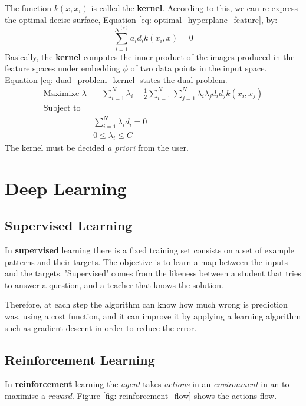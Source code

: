 \documentclass[11pt]{article}
\begin{document}
The function $k(x, x_i)$ is called the \textbf{kernel}. According to this, we can re-express the optimal decise surface, Equation \ref{eq: optimal_hyperplane_feature}, by:
\begin{equation}
\sum^{N^{(s)}}_{i = 1}a_id_ik(x_i,x) = 0
\label{eq: optimal_hyperplane_feature}
\end{equation} 
Basically, the \textbf{kernel} computes the inner product of the images produced in the feature spaces under embedding $\phi$ of two data points in the input space. Equation \ref{eq: dual_problem_kernel} states the dual problem.
\begin{equation}
    \label{eq: dual_problem_kernel}
    \begin{aligned}
    \text{Maximixe } \lambda & \quad \sum^N_{i=1} \lambda_i - \frac{1}{2} \sum_{i=1}^N \sum_{j=1}^N \lambda_i \lambda_j d_i d_j k(x_i,x_j) \\
     \text{Subject to} & \\
           & \sum^N_{i=1} \lambda_i d_i = 0\quad \\
           & 0 \le \lambda_i \le C 
         \end{aligned}
    \end{equation}
The kernel must be decided \emph{a priori} from the user.
\section{Deep Learning}
\subsection{Supervised Learning}
In \textbf{supervised} learning there is a fixed training set consists on a set of example patterns and their targets. The objective is to learn a map between the inputs and the targets. 'Supervised' comes from the likeness between a student that tries to answer a question, and a teacher that knows the solution.

Therefore, at each step the algorithm can know how much wrong is prediction was, using a cost function, and it can improve it by applying a learning algorithm such as gradient descent in order to reduce the error.

\subsection{Reinforcement Learning}
In \textbf{reinforcement} learning the \emph{agent} takes \emph{actions} in an \emph{environment} in an to maximise a \emph{reward}. Figure \ref{fig: reinforcement_flow} shows the actions flow.
\end{document}
